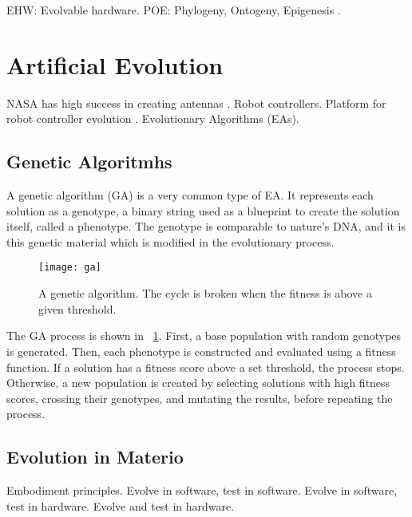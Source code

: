\TODO

EHW: Evolvable hardware.
POE: Phylogeny, Ontogeny, Epigenesis \cite{sipper1997poe}.


\section{Artificial Evolution}

\TODO

NASA has high success in creating antennas \cite{hornby2006antenna}.
Robot controllers.
Platform for robot controller evolution \cite{haddow1999robot}.
Evolutionary Algorithms (EAs).

\subsection{Genetic Algoritmhs}

A genetic algorithm (GA) is a very common type of EA.
It represents each solution as a genotype, a binary string used as a blueprint to create the solution itself, called a phenotype.
The genotype is comparable to nature's DNA, and it is this genetic material which is modified in the evolutionary process.

\begin{figure}[!ht]
    \centering
    \texttt{[image: ga]}
    \caption[Genetic Algorithm]{
        A genetic algorithm.
        The cycle is broken when the fitness is above a given threshold.
    }
    \label{fig:ga}
\end{figure}

The GA process is shown in \figurename~\ref{fig:ga}.
First, a base population with random genotypes is generated.
Then, each phenotype is constructed and evaluated using a fitness function.
If a solution has a fitness score above a set threshold, the process stops.
Otherwise, a new population is created by selecting solutions with high fitness scores, crossing their genotypes, and mutating the results, before repeating the process.

\subsection{Evolution in Materio}

\TODO
Embodiment principles.
Evolve in software, test in software.
Evolve in software, test in hardware.
Evolve and test in hardware.

